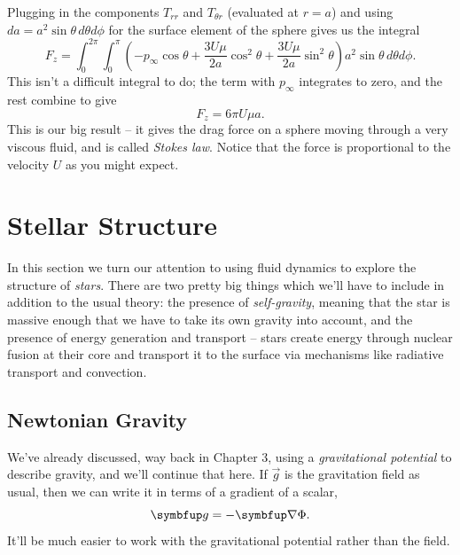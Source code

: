 Plugging in the components $T_{rr}$ and $T_{\theta r}$ (evaluated at $r=a$) and using $da = a^2 \sin\theta \, d\theta d\phi$ for the surface element of the sphere gives us the integral
\[
F_z = \int_0^{2\pi} \int_0^\pi \left( -p_\infty \cos\theta + \frac{3U \mu }{2a} \cos^2\theta + \frac{3U\mu }{2a} \sin^2\theta \right) a^2 \sin\theta \, d\theta d\phi.
\]
This isn't a difficult integral to do; the term with $p_\infty$ integrates to zero, and the rest combine to give
\begin{equation}
\boxed{
F_z = 6 \pi U \mu a.
}
\end{equation}
This is our big result -- it gives the drag force on a sphere moving through a very viscous fluid, and is called \emph{Stokes law}.  Notice that the force is proportional to the velocity $U$ as you might expect.



%
% 

\section{Stellar Structure}

In this section we turn our attention to using fluid dynamics to explore the structure of \emph{stars}.  There are two pretty big things which we'll have to include in addition to the usual theory:  the presence of \emph{self-gravity}, meaning that the star is massive enough that we have to take its own gravity into account, and the presence of energy generation and transport -- stars create energy through nuclear fusion at their core and transport it to the surface via mechanisms like radiative transport and convection.

\subsection{Newtonian Gravity}

We've already discussed, way back in Chapter 3, using a \emph{gravitational potential} to describe gravity, and we'll continue that here.  If $\vec{g}$ is the gravitation field as usual, then we can write it in terms of a gradient of a scalar,
\begin{equation}
\vec{g} = -\grad \Phi.
\end{equation}
It'll be much easier to work with the gravitational potential rather than the field.  


